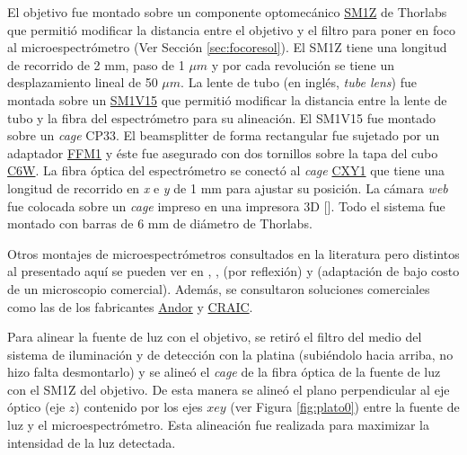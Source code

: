 El objetivo fue montado sobre un componente optomecánico \href{https://www.thorlabs.com/thorProduct.cfm?partNumber=SM1Z\#ad-image-0}{SM1Z} de Thorlabs que permitió modificar la distancia entre el objetivo y el filtro para poner en foco al microespectrómetro (Ver Sección \ref{sec:focoresol}). El SM1Z tiene una longitud de recorrido de 2 mm, paso de 1 $\mu m$ y por cada revolución se tiene un desplazamiento lineal de 50 $\mu m$.  La lente de tubo (en inglés, \textit{tube lens}) fue montada sobre un \href{https://www.thorlabs.com/thorproduct.cfm?partnumber=SM1V15}{SM1V15} que permitió modificar la distancia entre la lente de tubo y la fibra del espectrómetro para su alineación. El SM1V15 fue montado sobre un \textit{cage} CP33. El beamsplitter de forma rectangular fue sujetado por un adaptador \href{https://www.thorlabs.com/thorproduct.cfm?partnumber=FFM1\#ad-image-0}{FFM1} y éste fue asegurado con dos tornillos sobre la tapa del cubo \href{https://www.thorlabs.com/thorproduct.cfm?partnumber=C6W}{C6W}. La fibra óptica del espectrómetro se conectó al \textit{cage} \href{https://www.thorlabs.com/thorproduct.cfm?partnumber=CXY1\#ad-image-0}{CXY1} que tiene una longitud de recorrido en \textit{x} e \textit{y} de 1 mm para ajustar su posición. La cámara \textit{web} fue colocada sobre un \textit{cage} impreso en una impresora 3D [\href{https://github.com/jrr1984/open_frame_XYStage/blob/master/3dprintedparts/STLs/CAGE\_1pulgada.STL}{\faCubes}]. Todo el sistema fue montado con barras de 6 mm de diámetro de Thorlabs.

Otros montajes de microespectrómetros consultados en la literatura pero distintos al presentado aquí se pueden ver en \cite{frosch}, \cite{wong}, \cite{mour}(por reflexión) y \cite{frise} (adaptación de bajo costo de un microscopio comercial). Además, se consultaron soluciones comerciales como las de los fabricantes \href{https://andor.oxinst.com/learning/view/article/modular-solutions-for-microspectroscopy}{Andor} y \href{http://www.microspectra.com/}{CRAIC}.

Para alinear la fuente de luz con el objetivo, se retiró el filtro del medio del sistema de iluminación y de detección con la platina (subiéndolo hacia arriba, no hizo falta desmontarlo) y se alineó el \textit{cage} de la fibra óptica de la fuente de luz con el SM1Z del objetivo. De esta manera se alineó el plano perpendicular al eje óptico (eje $\textit{z}$) contenido por los ejes $\textit{x} e \textit{y}$ (ver Figura \ref{fig:plato0}) entre la fuente de luz y el microespectrómetro. Esta alineación fue realizada para maximizar la intensidad de la luz detectada.

